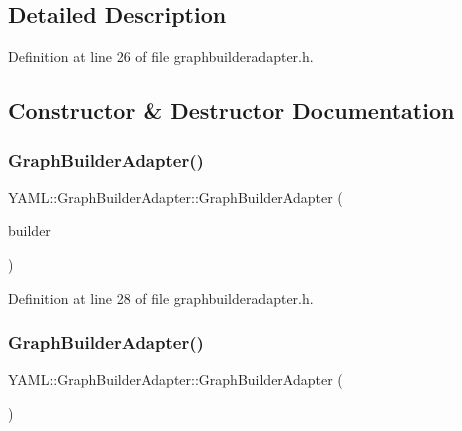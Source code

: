 \subsection{Detailed Description}


Definition at line 26 of file graphbuilderadapter.\+h.



\subsection{Constructor \& Destructor Documentation}
\mbox{\label{class_y_a_m_l_1_1_graph_builder_adapter_ab6065da602dd256c9664dbcf9bbcd4bb}} 
\subsubsection{\texorpdfstring{GraphBuilderAdapter()}{GraphBuilderAdapter()}\hspace{0.1cm}{\footnotesize\ttfamily [1/3]}}
{\footnotesize\ttfamily Y\+A\+M\+L\+::\+Graph\+Builder\+Adapter\+::\+Graph\+Builder\+Adapter (\begin{DoxyParamCaption}\item[{\mbox{\hyperlink{class_y_a_m_l_1_1_graph_builder_interface}{Graph\+Builder\+Interface}} \&}]{builder }\end{DoxyParamCaption})\hspace{0.3cm}{\ttfamily [inline]}}



Definition at line 28 of file graphbuilderadapter.\+h.

\mbox{\label{class_y_a_m_l_1_1_graph_builder_adapter_acb3a292b07fe50875a2ce8199e4ca80f}} 
\subsubsection{\texorpdfstring{GraphBuilderAdapter()}{GraphBuilderAdapter()}\hspace{0.1cm}{\footnotesize\ttfamily [2/3]}}
{\footnotesize\ttfamily Y\+A\+M\+L\+::\+Graph\+Builder\+Adapter\+::\+Graph\+Builder\+Adapter (\begin{DoxyParamCaption}\item[{const \mbox{\hyperlink{class_y_a_m_l_1_1_graph_builder_adapter}{Graph\+Builder\+Adapter}} \&}]{ }\end{DoxyParamCaption})\hspace{0.3cm}{\ttfamily [delete]}}

